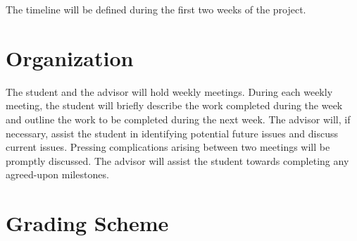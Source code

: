 \documentclass[a4paper, 12pt, DIV=15]{scrartcl}
\newcommand{\advisor}{Advisor Name}
\begin{document}
The timeline will be defined during the first two weeks of the project.






\section*{Organization}
The student and the advisor will hold weekly meetings.
During each weekly meeting, the student will briefly describe the work completed during the week and outline the work to be completed during the next week.
The advisor will, if necessary, assist the student in identifying potential future issues and discuss current issues.
Pressing complications arising between two meetings will be promptly discussed.
The advisor will assist the student towards completing any agreed-upon milestones.

\section*{Grading Scheme}
\end{document}
